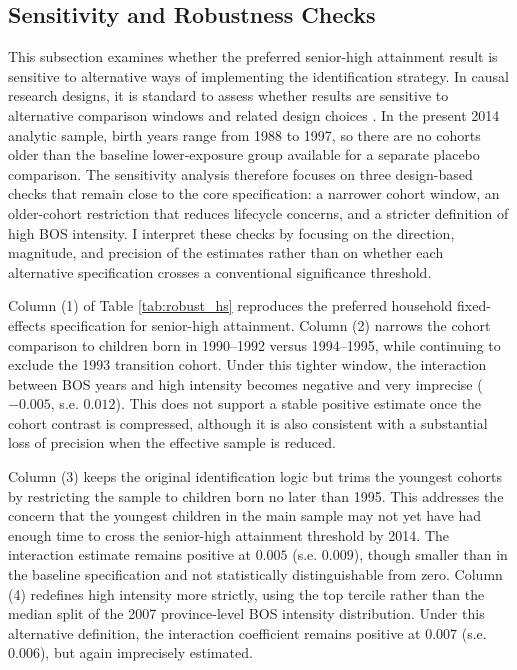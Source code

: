 \documentclass[a4paper, 12pt]{article}
\begin{document}
\begin{doublespacing}
\subsection{Sensitivity and Robustness Checks}
This subsection examines whether the preferred senior-high attainment result is sensitive to alternative ways of implementing the identification strategy. In causal research designs, it is standard to assess whether results are sensitive to alternative comparison windows and related design choices \citep{BertrandDufloMullainathan2004,XiaoLiZhao2017}. In the present 2014 analytic sample, birth years range from 1988 to 1997, so there are no cohorts older than the baseline lower-exposure group available for a separate placebo comparison. The sensitivity analysis therefore focuses on three design-based checks that remain close to the core specification: a narrower cohort window, an older-cohort restriction that reduces lifecycle concerns, and a stricter definition of high BOS intensity. I interpret these checks by focusing on the direction, magnitude, and precision of the estimates rather than on whether each alternative specification crosses a conventional significance threshold.



Column (1) of Table \ref{tab:robust_hs} reproduces the preferred household fixed-effects specification for senior-high attainment. Column (2) narrows the cohort comparison to children born in 1990--1992 versus 1994--1995, while continuing to exclude the 1993 transition cohort. Under this tighter window, the interaction between BOS years and high intensity becomes negative and very imprecise ($-0.005$, s.e. $0.012$). This does not support a stable positive estimate once the cohort contrast is compressed, although it is also consistent with a substantial loss of precision when the effective sample is reduced.

Column (3) keeps the original identification logic but trims the youngest cohorts by restricting the sample to children born no later than 1995. This addresses the concern that the youngest children in the main sample may not yet have had enough time to cross the senior-high attainment threshold by 2014. The interaction estimate remains positive at $0.005$ (s.e. $0.009$), though smaller than in the baseline specification and not statistically distinguishable from zero. Column (4) redefines high intensity more strictly, using the top tercile rather than the median split of the 2007 province-level BOS intensity distribution. Under this alternative definition, the interaction coefficient remains positive at $0.007$ (s.e. $0.006$), but again imprecisely estimated.


\end{doublespacing}
\end{document}
